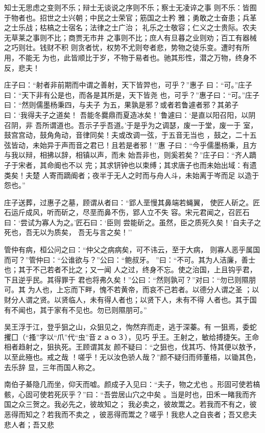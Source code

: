 \documentclass[]{article}
\begin{document}
知士无思虑之变则不乐；辩士无谈说之序则不乐；察士无凌谇之事
则不乐：皆囿于物者也。招世之士兴朝；中民之士荣官；筋国之士矜
雅；勇敢之士奋患；兵革之士乐战；枯槁之士宿名；法律之士广治；
礼乐之士敬容；仁义之士贵际。农夫无草莱之事则不比；商贾无市井
之事则不比；庶人有旦暮之业则劝；百工有器械之巧则壮。钱财不积
则贪者忧，权势不尤则夸者悲，势物之徒乐变。遭时有所用，不能无
为也，此皆顺比于岁，不物于易者也。驰其形性，潜之万物，终身不 反，悲夫！

庄子曰：``射者非前期而中谓之善射，天下皆羿也，可乎？''惠子
曰：``可。''庄子曰：``天下非有公是也，而各是其所是，天下皆尧
也，可乎？''惠子曰：``可。''庄子曰：``然则儒墨杨秉四，与夫子
为五，果孰是邪？或者若鲁遽者邪？其弟子曰：`我得夫子之道矣！
吾能冬爨鼎而夏造冰矣！'鲁遽曰：`是直以阳召阳，以阴召阴，非
吾所谓道也。吾示子乎吾道。'于是乎为之调瑟，废一于堂，废一于
室，鼓宫宫动，鼓角角动，音律同矣！夫或改调一弦，于五音无当也
，鼓之，二十五弦皆动，未始异于声而音之君已！且若是者邪！''惠
子曰∶``今乎儒墨杨秉，且方与我以辩，相拂以辞，相镇以声，而未
始吾非也，则奚若矣？''庄子曰：``齐人蹢子于宋者，其命阍也不以
完；其求钘钟也以束缚；其求唐子也而未始出域：有遗类矣！夫楚
人寄而蹢阍者；夜半于无人之时而与舟人斗，未始离于岑而足 以造于怨也。''

庄子送葬，过惠子之墓，顾谓从者曰：``郢人垩慢其鼻端若蝇翼，
使匠人斫之。匠石运斤成风，听而斫之，尽垩而鼻不伤，郢人立不失
容。宋元君闻之，召匠石曰：`尝试为寡人为之。'匠石曰：`臣则
尝能斫之。虽然，臣之质死久矣！'自夫子之死也，吾无以为质矣，
吾无与言之矣！''

管仲有病，桓公问之曰：``仲父之病病矣，可不讳云，至于大病，
则寡人恶乎属国而可？''管仲曰：``公谁欲与？''公曰：``鲍叔牙。
''曰：``不可。其为人洁廉，善士也；其于不己若者不比之；又一闻
人之过，终身不忘。使之治国，上且钩乎君，下且逆乎民。其得罪于
君也将弗久矣！''公曰：``然则孰可？''对曰：``勿已则隰朋可。其
为人也，上忘而下畔，愧不若黄帝，而哀不己若者。以德分人谓之圣
；以财分人谓之贤。以贤临人，未有得人者也；以贤下人，未有不得
人者也。其于国有不闻也，其于家有不见也。勿已则隰朋可。''

吴王浮于江，登乎狙之山，众狙见之，恂然弃而走，逃于深蓁。有
一狙焉，委蛇攫囗（``搔''字以``爪''代``虫''音ｚａｏ３），见巧
乎王。王射之，敏给搏捷矢。王命相者趋射之，狙执死。王顾谓其友
颜不疑曰：``之狙也，伐其巧、恃其便以敖予，以至此殛也。戒之哉
！嗟乎！无以汝色骄人哉？''颜不疑归而师董梧，以锄其色，去乐辞
显，三年而国人称之。

南伯子綦隐几而坐，仰天而嘘。颜成子入见曰：``夫子，物之尤也
。形固可使若槁骸，心固可使若死灰乎？''曰：``吾尝居山穴之中矣
。当是时也，田禾一睹我而齐国之众三贺之。我必先之，彼故知之；
我必卖之，彼故鬻之。若我而不有之，彼恶得而知之？若我而不卖之
，彼恶得而鬻之？嗟乎！我悲人之自丧者；吾又悲夫悲人者；吾又悲
\end{document}
